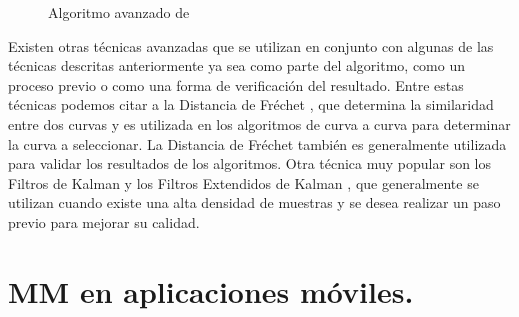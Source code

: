 \begin{figure}[h]
\centering
\begin{singlespace}
\end{singlespace}
\caption{Algoritmo avanzado de \citep{quddus2006high}}
\label{fig:algoritmo-avanzado} 
\end{figure}

Existen otras técnicas avanzadas que se utilizan en conjunto con algunas de las técnicas descritas anteriormente ya sea como parte del algoritmo, como un proceso previo o como una forma de verificación del resultado. Entre estas técnicas podemos citar a la Distancia de Fréchet \citep{chen2011approximate,eisner2011algorithms}, que determina la similaridad entre dos curvas y es utilizada en los algoritmos de curva a curva para determinar la curva a seleccionar. La Distancia de Fréchet también es generalmente utilizada para validar los resultados de los algoritmos. Otra técnica muy popular son los Filtros de Kalman y los Filtros Extendidos de Kalman \citep{kim2001adaptive}, que generalmente se utilizan cuando existe una alta densidad de muestras y se desea realizar un paso previo para mejorar su calidad.

\section{MM en aplicaciones móviles.}

